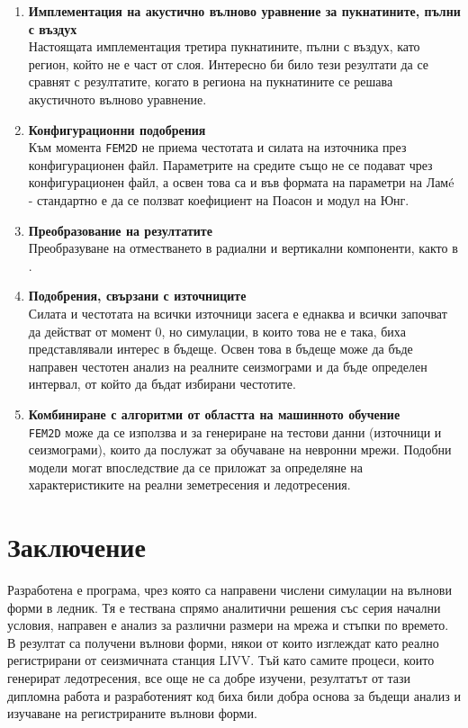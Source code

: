 \documentclass{report}
\begin{document}
\begin{enumerate}
		\item \textbf{Имплементация на акустично вълново уравнение за пукнатините, пълни с въздух} \\
		Настоящата имплементация третира пукнатините, пълни с въздух, като регион, който не е част от слоя. Интересно би било тези резултати да се сравнят с резултатите, когато в региона на пукнатините се решава акустичното вълново уравнение.
		
		\item \textbf{Конфигурационни подобрения} \\
		Към момента \texttt{FEM2D} не приема честотата и силата на източника през конфигурационен файл. Параметрите на средите също не се подават чрез конфигурационен файл, а освен това са и във формата на параметри на Ламé - стандартно е да се ползват коефициент на Поасон и модул на Юнг.
		
		\item \textbf{Преобразование на резултатите} \\
		Преобразуване на отместването в радиални и вертикални компоненти, както в \cite{Komatitsch2002}.
		
		\item \textbf{Подобрения, свързани с източниците} \\
		Силата и честотата на всички източници засега е еднаква и всички започват да действат от момент $0$, но симулации, в които това не е така, биха представлявали интерес в бъдеще. Освен това в бъдеще може да бъде направен честотен анализ на реалните сеизмограми и да бъде определен интервал, от който да бъдат избирани честотите.
		
		\item \textbf{Комбиниране с алгоритми от областта на машинното обучение} \\
		\texttt{FEM2D} може да се използва и за генериране на тестови данни (източници и сеизмограми), които да послужат за обучаване на невронни мрежи. Подобни модели могат впоследствие да се приложат за определяне на характеристиките на реални земетресения и ледотресения.
	\end{enumerate}
	 
	 
	\section{Заключение}
	Разработена е програма, чрез която са направени числени симулации на вълнови форми в ледник. Тя е тествана спрямо аналитични решения със серия начални условия, направен е анализ за различни размери на мрежа и стъпки по времето. В резултат са получени вълнови форми, някои от които изглеждат като реално регистрирани от сеизмичната станция LIVV. Тъй като самите процеси, които генерират ледотресения, все още не са добре изучени, резултатът от тази дипломна работа и разработеният код биха били добра основа за бъдещи анализ и изучаване на регистрираните вълнови форми.
	 
\end{document}
